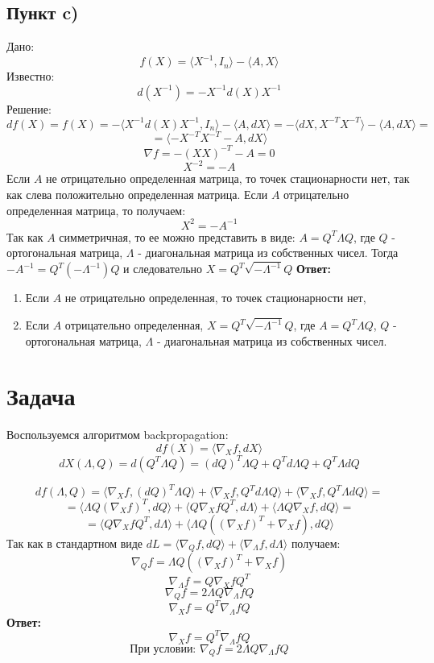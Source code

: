\documentclass[a4paper,12pt]{article}
\begin{document}
\subsection{Пункт c)}

Дано:
    \[f(X) = \langle X^{-1}, I_n \rangle - \langle A, X \rangle\]
Известно:
    \[d(X^{-1}) = - X^{-1} d(X) X^{-1}\]
Решение:
    \[df(X) = f(X) = - \langle X^{-1} d(X) X^{-1}, I_n \rangle - \langle A, dX \rangle = - \langle dX, X^{-T}X^{-T} \rangle - \langle A, dX \rangle = \]
    \[= \langle - X^{-T}X^{-T} - A, dX \rangle\]
    \[\nabla f = - (XX)^{-T} - A = 0\]
    \[X^{-2} = - A\]
Если $A$ не отрицательно определенная матрица, то точек стационарности нет, так как слева положительно определенная матрица. Если $A$ отрицательно определенная матрица, то получаем:
    \[X^2 = - A^{-1}\]
Так как $A$ симметричная, то ее можно представить в виде: $A = Q^T \Lambda Q$, где $Q$ - ортогональная матрица, $\Lambda$ - диагональная матрица из собственных чисел. Тогда $- A^{-1} = Q^T (-\Lambda^{-1}) Q$ и следовательно $X = Q^T \sqrt{-\Lambda^{-1}} Q$
\textbf{Ответ:}
\begin{enumerate}
    \item Если $A$ не отрицательно определенная, то точек стационарности нет,
    \item Если $A$ отрицательно определенная, $X = Q^T \sqrt{-\Lambda^{-1}} Q$, где $A = Q^T \Lambda Q$, $Q$ - ортогональная матрица, $\Lambda$ - диагональная матрица из собственных чисел.
\end{enumerate}

\section{Задача}

Воспользуемся алгоритмом backpropagation:
    \[df(X) = \langle \nabla_X f, dX \rangle\]
    \[dX(\Lambda, Q) = d(Q^T \Lambda Q) = (dQ)^T \Lambda Q + Q^T d\Lambda Q + Q^T \Lambda dQ\]
    
    \[df(\Lambda, Q) = \langle \nabla_X f, (dQ)^T \Lambda Q \rangle + \langle \nabla_X f, Q^T d\Lambda Q \rangle + \langle \nabla_X f, Q^T \Lambda dQ \rangle = \]
    \[= \langle \Lambda Q (\nabla_X f)^T, dQ \rangle + \langle Q \nabla_X f Q^T, d\Lambda \rangle + \langle \Lambda Q \nabla_X f, dQ \rangle =\]
    \[= \langle Q \nabla_X f Q^T, d\Lambda \rangle + \langle \Lambda Q ((\nabla_X f)^T + \nabla_X f), dQ \rangle\]
Так как в стандартном виде $dL = \langle \nabla_Q f, dQ \rangle + \langle \nabla_{\Lambda} f, d\Lambda \rangle$ получаем:
    \[\nabla_Q f = \Lambda Q ((\nabla_X f)^T + \nabla_X f)\]
    \[\nabla_{\Lambda} f = Q \nabla_X f Q^T\]
    \[\nabla_Q f = 2 \Lambda Q \nabla_{\Lambda} f Q\]
    \[\nabla_X f = Q^T \nabla_{\Lambda} f Q\]
\textbf{Ответ:}
    \[\nabla_X f = Q^T \nabla_{\Lambda} f Q\]
    \[\text{При условии: } \nabla_Q f = 2 \Lambda Q \nabla_{\Lambda} f Q\]
\end{document}

